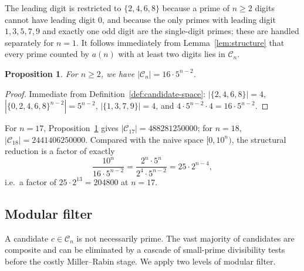 \documentclass[11pt,a4paper]{article}
\newtheorem{proposition}[theorem]{Proposition}
\theoremstyle{definition}
\begin{document}
The leading digit is restricted to $\{2,4,6,8\}$ because a prime of $n \geq 2$
digits cannot have leading digit $0$, and because the only primes with
leading digit $1, 3, 5, 7, 9$ and exactly one odd digit are the single-digit
primes; these are handled separately for $n=1$. It follows immediately from
Lemma~\ref{lem:structure} that every prime counted by $a(n)$ with at least
two digits lies in $\mathcal{C}_n$.

\begin{proposition}\label{prop:cardinality}
For $n \geq 2$, we have $|\mathcal{C}_n| = 16 \cdot 5^{n-2}$.
\end{proposition}

\begin{proof}
Immediate from Definition~\ref{def:candidate-space}:
$|\{2,4,6,8\}| = 4$,
$|\{0,2,4,6,8\}^{n-2}| = 5^{n-2}$,
$|\{1,3,7,9\}| = 4$,
and $4 \cdot 5^{n-2} \cdot 4 = 16 \cdot 5^{n-2}$.
\end{proof}

For $n = 17$, Proposition~\ref{prop:cardinality} gives
$|\mathcal{C}_{17}| = \num{488281250000}$;
for $n = 18$, $|\mathcal{C}_{18}| = \num{2441406250000}$.
Compared with the naive space $[0, 10^n)$, the structural reduction is a
factor of exactly
\[
  \frac{10^n}{16 \cdot 5^{n-2}}
  = \frac{2^n \cdot 5^n}{2^4 \cdot 5^{n-2}}
  = 25 \cdot 2^{n-4},
\]
i.e.\ a factor of $25 \cdot 2^{13} = \num{204800}$ at $n=17$.

\subsection{Modular filter}\label{sec:modular-filter}

A candidate $c \in \mathcal{C}_n$ is not necessarily prime. The vast majority
of candidates are composite and can be eliminated by a cascade of small-prime
divisibility tests before the costly Miller--Rabin stage. We apply two levels
of modular filter.
\end{document}
